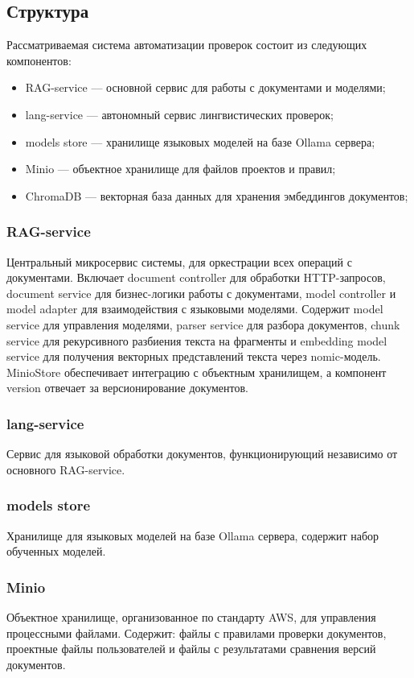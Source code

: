 \subsection{Структура}
Рассматриваемая система автоматизации проверок состоит из следующих компонентов:
\begin{itemize}[nosep, leftmargin=*, labelindent=\parindent]
  \item RAG-service — основной сервис для работы с документами и моделями;
  \item lang-service — автономный сервис лингвистических проверок;
  \item models store — хранилище языковых моделей на базе Ollama сервера;
  \item Minio — объектное хранилище для файлов проектов и правил;
  \item ChromaDB — векторная база данных для хранения эмбеддингов документов;
\end{itemize}

\subsubsection{RAG-service}
Центральный микросервис системы, для оркестрации всех операций с документами. 
Включает document controller для обработки HTTP-запросов, 
document service для бизнес-логики работы с документами, 
model controller и model adapter для взаимодействия с языковыми моделями. 
Содержит model service для управления моделями, 
parser service для разбора документов, 
chunk service для рекурсивного разбиения текста на фрагменты и 
embedding model service для получения векторных представлений текста через nomic-модель. 
MinioStore обеспечивает интеграцию с объектным хранилищем, а компонент version отвечает за версионирование документов.

\subsubsection{lang-service}
Сервис для языковой обработки документов, 
функционирующий независимо от основного RAG-service.

\subsubsection{models store}
Хранилище для языковых моделей на базе Ollama сервера, 
содержит набор обученных моделей.

\subsubsection{Minio}
Объектное хранилище, организованное по стандарту AWS,
для управления процессными файлами. 
Содержит: файлы с правилами проверки документов, проектные файлы пользователей и файлы с результатами сравнения версий документов.

